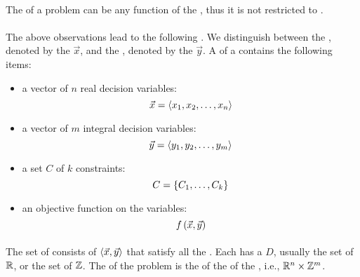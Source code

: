 \begin{definition}
\paragraph{}
The  of a problem can be any function of the , thus it is not restricted to .

\paragraph{}
The above observations lead to the following . We distinguish between the , denoted by the  $\vec{x}$, and the , denoted by the  $\vec{y}$. A  of a  contains the following items:
\begin{itemize}
 \item a vector of $n$ real decision variables:
 \begin{equation}
  \vec{x}=\left\langle x_1,x_2,\ldots,x_n \right\rangle
 \end{equation}
 \item a vector of $m$ integral decision variables:
 \begin{equation}
  \vec{y}=\left\langle y_1,y_2,\ldots,y_m \right\rangle
 \end{equation}
 \item a set $C$ of $k$ constraints:
 \begin{equation}
  C=\left\{ C_1,\ldots,C_k \right\}
 \end{equation}
 \item an objective function on the variables:
 \begin{equation}
  f\left( \vec{x},\vec{y} \right)
 \end{equation}
\end{itemize}

\paragraph{}
The set of  consists of  $\left\langle \vec{x},\vec{y} \right\rangle$ that satisfy all the . Each  has a  $D$, usually the set of  $\mathbb{R}$, or the set of  $\mathbb{Z}$. The  of the problem is the  of the  of the , i.e., $\mathbb{R}^n\times\mathbb{Z}^m$.


\end{definition}
